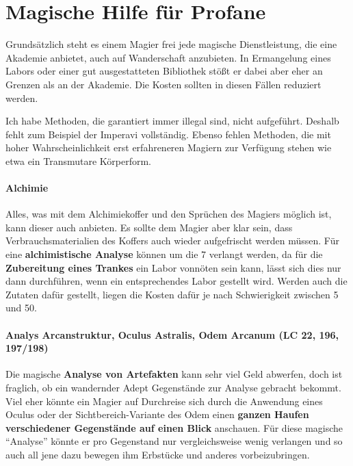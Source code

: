 \section{Magische Hilfe für Profane}
Grundsätzlich steht es einem Magier frei jede magische Dienstleistung, die eine Akademie anbietet, auch auf Wanderschaft anzubieten. In Ermangelung eines Labors oder einer gut ausgestatteten Bibliothek stößt er dabei aber eher an Grenzen als an der Akademie. Die Kosten sollten in diesen Fällen reduziert werden.

Ich habe Methoden, die garantiert immer illegal sind, nicht aufgeführt. Deshalb fehlt zum Beispiel der Imperavi vollständig. Ebenso fehlen Methoden, die mit hoher Wahrscheinlichkeit erst erfahreneren Magiern zur Verfügung stehen wie etwa ein Transmutare Körperform.

\paragraph{Alchimie}
Alles, was mit dem Alchimiekoffer und den Sprüchen des Magiers möglich ist, kann dieser auch anbieten. Es sollte dem Magier aber klar sein, dass Verbrauchsmaterialien des Koffers auch wieder aufgefrischt werden müssen. Für eine \textbf{alchimistische Analyse} können um die \SI{7}{\D} verlangt werden, da für die \textbf{Zubereitung eines Trankes} ein Labor vonnöten sein kann, lässt sich dies nur dann durchführen, wenn ein entsprechendes Labor gestellt wird. Werden auch die Zutaten dafür gestellt, liegen die Kosten dafür je nach Schwierigkeit zwischen \SI{5}{\D} und \SI{50}{\D}.

\paragraph{Analys Arcanstruktur, Oculus Astralis, Odem Arcanum (LC 22, 196, 197/198)}
Die magische \textbf{Analyse von Artefakten} kann sehr viel Geld abwerfen, doch ist fraglich, ob ein wandernder Adept Gegenstände zur Analyse gebracht bekommt. Viel eher könnte ein Magier auf Durchreise sich durch die Anwendung eines Oculus oder der Sichtbereich-Variante des Odem einen \textbf{ganzen Haufen verschiedener Gegenstände auf einen Blick} anschauen. Für diese magische \enquote{Analyse} könnte er pro Gegenstand nur vergleichsweise wenig verlangen und so auch all jene dazu bewegen ihm Erbstücke und anderes vorbeizubringen.

